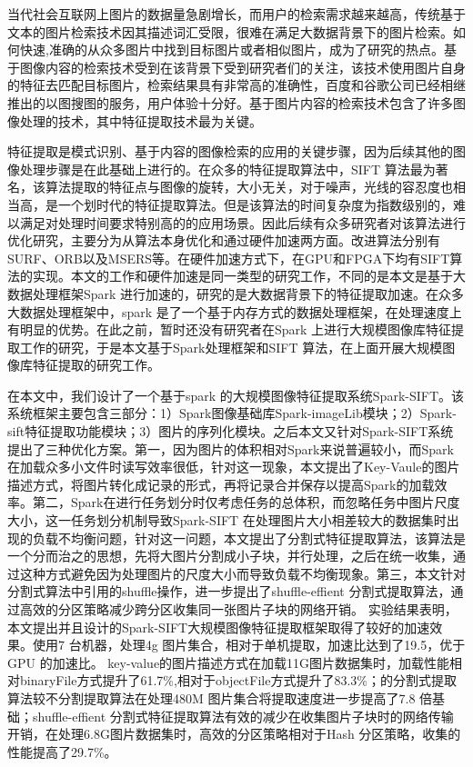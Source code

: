 ﻿\begin{cabstract}
当代社会互联网上图片的数据量急剧增长，而用户的检索需求越来越高，传统基于文本的图片检索技术因其描述词汇受限，很难在满足大数据背景下的图片检索。如何快速,准确的从众多图片中找到目标图片或者相似图片，成为了研究的热点。基于图像内容的检索技术受到在该背景下受到研究者们的关注，该技术使用图片自身的特征去匹配目标图片，检索结果具有非常高的准确性，百度和谷歌公司已经相继推出的以图搜图的服务，用户体验十分好。基于图片内容的检索技术包含了许多图像处理的技术，其中特征提取技术最为关键。

特征提取是模式识别、基于内容的图像检索的应用的关键步骤，因为后续其他的图像处理步骤是在此基础上进行的。在众多的特征提取算法中，SIFT 算法最为著名，该算法提取的特征点与图像的旋转，大小无关，对于噪声，光线的容忍度也相当高，是一个划时代的特征提取算法。但是该算法的时间复杂度为指数级别的，难以满足对处理时间要求特别高的的应用场景。因此后续有众多研究者对该算法进行优化研究，主要分为从算法本身优化和通过硬件加速两方面。改进算法分别有SURF、ORB以及MSERS等。在硬件加速方式下，在GPU和FPGA下均有SIFT算法的实现。本文的工作和硬件加速是同一类型的研究工作，不同的是本文是基于大数据处理框架Spark 进行加速的，研究的是大数据背景下的特征提取加速。在众多大数据处理框架中，spark 是了一个基于内存方式的数据处理框架，在处理速度上有明显的优势。在此之前，暂时还没有研究者在Spark 上进行大规模图像库特征提取工作的研究，于是本文基于Spark处理框架和SIFT 算法，在上面开展大规模图像库特征提取的研究工作。

在本文中，我们设计了一个基于spark 的大规模图像特征提取系统Spark-SIFT。该系统框架主要包含三部分：1）Spark图像基础库Spark-imageLib模块；2）Spark-sift特征提取功能模块；3）图片的序列化模块。之后本文又针对Spark-SIFT系统提出了三种优化方案。第一，因为图片的体积相对Spark来说普遍较小，而Spark在加载众多小文件时读写效率很低，针对这一现象，本文提出了Key-Vaule的图片描述方式，将图片转化成记录的形式，再将记录合并保存以提高Spark的加载效率。第二，Spark在进行任务划分时仅考虑任务的总体积，而忽略任务中图片尺度大小，这一任务划分机制导致Spark-SIFT 在处理图片大小相差较大的数据集时出现的负载不均衡问题，针对这一问题，本文提出了分割式特征提取算法，该算法是一个分而治之的思想，先将大图片分割成小子块，并行处理，之后在统一收集，通过这种方式避免因为处理图片的尺度大小而导致负载不均衡现象。第三，本文针对分割式算法中引用的shuffle操作，进一步提出了shuffle-effient 分割式提取算法，通过高效的分区策略减少跨分区收集同一张图片子块的网络开销。 实验结果表明，本文提出并且设计的Spark-SIFT大规模图像特征提取框架取得了较好的加速效果。使用7 台机器，处理4g 图片集合，相对于单机提取，加速比达到了19.5，优于GPU 的加速比。 key-value的图片描述方式在加载11G图片数据集时，加载性能相对binaryFile方式提升了61.7\%,相对于objectFile方式提升了83.3\%；的分割式提取算法较不分割提取算法在处理480M 图片集合将提取速度进一步提高了7.8 倍基础；shuffle-effient 分割式特征提取算法有效的减少在收集图片子块时的网络传输开销，在处理6.8G图片数据集时，高效的分区策略相对于Hash 分区策略，收集的性能提高了29.7\%。
\end{cabstract}

